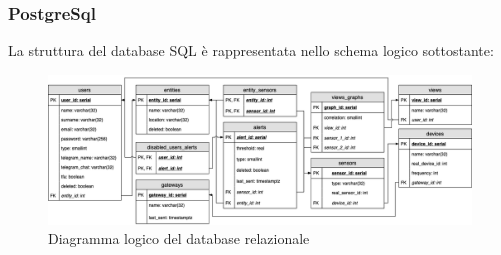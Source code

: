 	\subsubsection{PostgreSql}
	La struttura del database SQL è rappresentata nello schema logico sottostante:
		
			\begin{landscape}
			\begin{figure}[H]
				\centering
				\includegraphics[scale=0.600]{res/images/DATABASE/ER_Modificato.png}
				\caption{Diagramma logico del database relazionale}
				\label{Diagramma 9}
			\end{figure}
			\end{landscape}